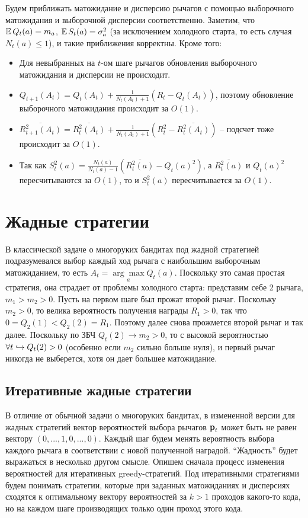 Будем приближать матожидание и дисперсию рычагов с помощью выборочного матожидания и выборочной дисперсии соответственно. Заметим, что $\mathbb{E} \, Q_t(a) = m_a$, $\mathbb{E} \, S_t(a) = \sigma_a^2$ (за исключением холодного старта, то есть случая $N_t(a) \leq 1$), и такие приближения корректны. Кроме того:
\begin{itemize}
    \item Для невыбранных на $t$-ом шаге рычагов обновления выборочного матожидания и дисперсии не происходит.
    \item $Q_{t+1}(A_t) = Q_t(A_t) + \frac{1}{N_{t}(A_t) + 1}(R_t - Q_t(A_t))$, поэтому обновление выборочного матожидания происходит за $O(1)$.
    \item $\overline{R_{t+1}^2(A_t)} = \overline{R_t^2(A_t)} + \frac{1}{N_{t}(A_t) + 1}(R_t^2 - \overline{R_t^2(A_t)})$ -- подсчет тоже происходит за $O(1)$.
    \item Так как $S_t^2(a) = \frac{N_t(a)}{N_t(a) - 1}(\overline{R_t^2(a)} - Q_t(a)^2)$, а $\overline{R_t^2(a)}$ и $Q_t(a)^2$ пересчитываются за $O(1)$, то и $S_t^2(a)$ пересчитывается за $O(1)$.
\end{itemize}

\section{Жадные стратегии}

В классической задаче о многоруких бандитах под жадной стратегией подразумевался выбор каждый ход рычага с наибольшим выборочным матожиданием, то есть $A_t = \underset{a}{\arg \max} Q_t(a)$. Поскольку это самая простая стратегия, она страдает от проблемы холодного старта: представим себе 2 рычага, $m_1 > m_2 > 0$. Пусть на первом шаге был прожат второй рычаг. Поскольку $m_2 > 0$, то велика вероятность получения награды $R_1 > 0$, так что $0 = Q_2(1) < Q_2(2) = R_1$. Поэтому далее снова прожмется второй рычаг и так далее. Поскольку по ЗБЧ $Q_t(2) \to m_2 > 0$, то с высокой вероятностью $\forall t \hookrightarrow Q_t(2) > 0$ (особенно если $m_2$ сильно больше нуля), и первый рычаг никогда не выберется, хотя он дает большее матожидание. 

\subsection{Итеративные жадные стратегии}
\label{subsec:theory_iterative}

В отличие от обычной задачи о многоруких бандитах, в измененной версии для жадных стратегий вектор вероятностей выбора рычагов $\textbf{p}_t$ может быть не равен вектору $(0, ..., 1, 0, ..., 0)$. Каждый шаг будем менять вероятность выбора каждого рычага в соответствии с новой полученной наградой. ``Жадность'' будет выражаться в несколько другом смысле. Опишем сначала процесс изменения вероятностей для итеративных greedy-стратегий. Под итеративными стратегиями будем понимать стратегии, которые при заданных матожиданиях и дисперсиях сходятся к оптимальному вектору вероятностей за $k > 1$ проходов какого-то кода, но на каждом шаге производящих только один проход этого кода.

